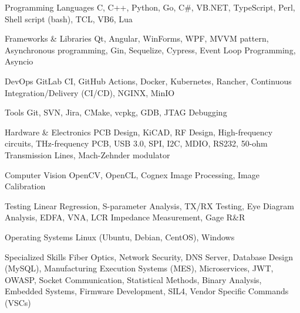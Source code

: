 
\begin{cvskills}

  \cvskill
    {Programming Languages} %
      {C, C++, Python, Go, C\#, VB.NET, TypeScript, Perl, Shell script (bash), TCL, VB6, Lua} %

  \cvskill
    {Frameworks \& Libraries} %
      {Qt, Angular, WinForms, WPF, MVVM pattern, Asynchronous programming, Gin, Sequelize, Cypress, Event Loop Programming, Asyncio} %

  \cvskill
    {DevOps} %
      {GitLab CI, GitHub Actions, Docker, Kubernetes, Rancher, Continuous Integration/Delivery (CI/CD), NGINX, MinIO} %

  \cvskill
    {Tools} %
    {Git, SVN, Jira, CMake, vcpkg, GDB, JTAG Debugging} %

  \cvskill
    {Hardware \& Electronics} %
    {PCB Design, KiCAD, RF Design, High-frequency circuits, THz-frequency PCB, USB 3.0, SPI, I2C, MDIO, RS232, 50-ohm Transmission Lines, Mach-Zehnder modulator} %

  \cvskill
    {Computer Vision} %
      {OpenCV, OpenCL, Cognex Image Processing, Image Calibration} %

  \cvskill
    {Testing} %
      {Linear Regression, S-parameter Analysis, TX/RX Testing, Eye Diagram Analysis, EDFA, VNA, LCR Impedance Measurement, Gage R\&R} %

  \cvskill
    {Operating Systems} %
    {Linux (Ubuntu, Debian, CentOS), Windows} %

  \cvskill
    {Specialized Skills} %
    {Fiber Optics, Network Security, DNS Server, Database Design (MySQL), Manufacturing Execution Systems (MES), Microservices, JWT, OWASP, Socket Communication, Statistical Methods, Binary Analysis, Embedded Systems, Firmware Development, SIL4, Vendor Specific Commands (VSCs)} %


\end{cvskills}
